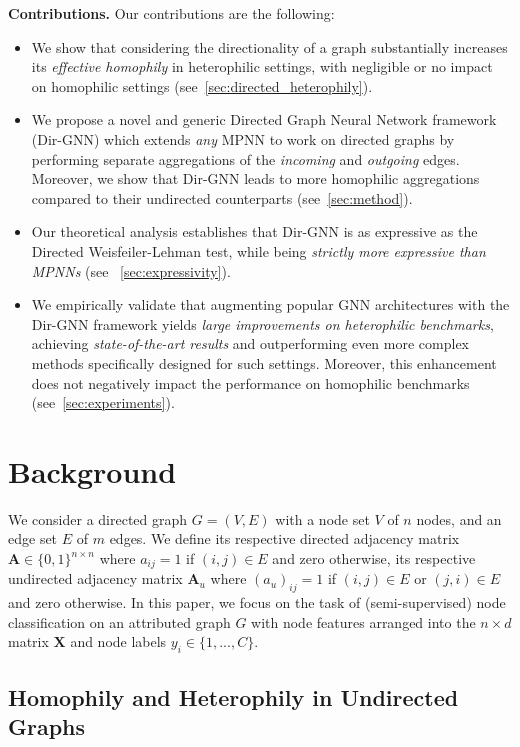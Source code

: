 \documentclass{article}
\newcommand\ours{Directed Graph Neural Network}
\newcommand\oursacro{Dir-GNN}
\newcommand\nnodes{n}
\newcommand\nedges{m}
\newcommand\nfeatures{d}
\newcommand\nclass{C}
\theoremstyle{plain}
\theoremstyle{definition}
\theoremstyle{remark}
\begin{document}
\textbf{Contributions.} 
Our contributions are the following:
\begin{itemize}[leftmargin=*]
    \setlength\itemsep{-0em}
    \item We show that considering the directionality of a graph substantially increases its \textit{effective homophily} in heterophilic settings, with negligible or no impact on homophilic settings (see~\cref{sec:directed_heterophily}). 
    \item We propose a novel and generic \ours{} framework (\oursacro{}) which extends \emph{any} MPNN to work on directed graphs by performing separate aggregations of the \emph{incoming} and \emph{outgoing} edges. Moreover, we show that \oursacro{} leads to more homophilic aggregations compared to their undirected counterparts (see~\cref{sec:method}). 
    \item Our theoretical analysis establishes that \oursacro{} is as expressive as the Directed Weisfeiler-Lehman test, while being \emph{strictly more expressive than MPNNs} (see ~\cref{sec:expressivity}).
    \item We empirically validate that augmenting popular GNN architectures with the \oursacro{} framework yields \emph{large improvements on heterophilic benchmarks}, achieving \emph{state-of-the-art results} and outperforming even more complex methods specifically designed for such settings. Moreover, this enhancement does not negatively impact the performance on homophilic benchmarks (see~\cref{sec:experiments}).
\end{itemize} \section{Background}
\label{sec:background}

We consider a directed graph $G=(V, E)$ with a node set $V$ of $\nnodes$ nodes, and an edge set $E$ of $\nedges$ edges. We define its respective directed adjacency matrix $\mathbf{A} \in \{0, 1\}^{\nnodes \times \nnodes}$ where $a_{ij}=1$ if $(i,j) \in E$ and zero otherwise, its respective undirected adjacency matrix $\mathbf{A}_u$ where $(a_{u})_{ij}=1$ if $(i,j) \in E$ or $(j, i) \in E$ and zero otherwise.
In this paper, we focus on the task of (semi-supervised) node classification on an attributed graph $G$ with node features arranged into the $\nnodes \times \nfeatures$ matrix $\mathbf{X}$ and node labels $y_i \in \{1, ..., \nclass\}$.

\subsection{Homophily and Heterophily in Undirected Graphs} \label{sec:heterophily_in_gnns}
\end{document}
